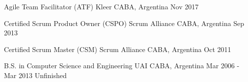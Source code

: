 
\begin{cventries}
  \cventry
    {Agile Team Facilitator (ATF)} %
    {Kleer} %
    {CABA, Argentina} %
    {Nov 2017} %
    {}

  \cventry
    {Certified Scrum Product Owner (CSPO)} %
    {Scrum Alliance} %
    {CABA, Argentina} %
    {Sep 2013} %
    {}

  \cventry
    {Certified Scrum Master (CSM)} %
    {Scrum Alliance} %
    {CABA, Argentina} %
    {Oct 2011} %
    {}

  \cventry
    {B.S. in Computer Science and Engineering} %
    {UAI} %
    {CABA, Argentina} %
    {Mar 2006 - Mar 2013} %
    {Unfinished}

\end{cventries}
